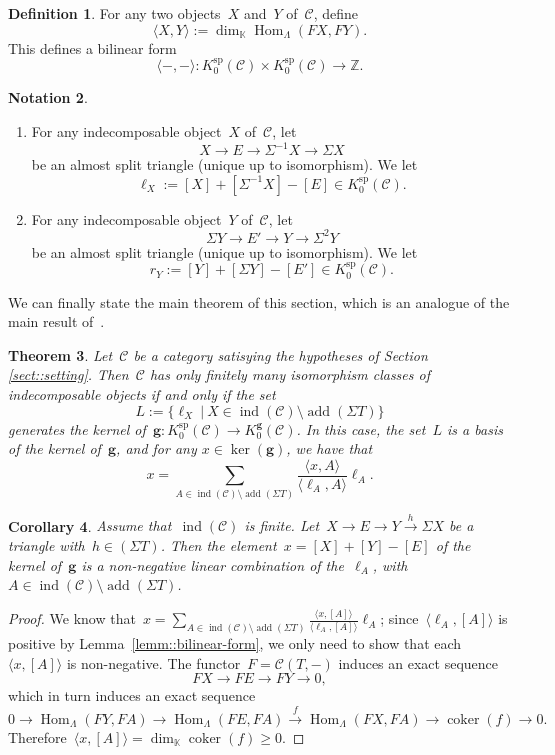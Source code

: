 \documentclass{amsart}
\newtheorem{theorem}{Theorem}[section]
\newtheorem{corollary}[theorem]{Corollary}
\theoremstyle{definition}
\newtheorem{definition}[theorem]{Definition}
\newtheorem{notation}[theorem]{Notation}
\newcommand{\Z}{\mathbb{Z}} %
\renewcommand{\b}[1]{{\boldsymbol{#1}}} %
\newcommand{\field}{\mathbb{K}}
\newcommand{\cat}{\mathcal{C}}
\newcommand{\Hom}[1]{\operatorname{Hom}_{#1}}
\newcommand{\susp}{\Sigma}
\newcommand{\add}{\operatorname{add}}
\newcommand{\spl}{\operatorname{sp}}
\newcommand{\Ksp}{K_0^{\spl}}
\newcommand{\Kg}{K_0^{\b{g}}}
\newcommand{\ind}{\operatorname{ind}}
\newcommand{\coker}{\operatorname{coker}}
\begin{document}
\begin{definition}\label{defi::bilinear form}
 For any two objects~$X$ and~$Y$ of~$\cat$, define
 \[
  \langle X, Y \rangle := \dim_{\field} \Hom{\Lambda}(FX,FY).
 \]
 This defines a bilinear form
 \[
  \langle -,-\rangle : \Ksp(\cat) \times \Ksp(\cat) \xrightarrow{} \Z.
 \]
\end{definition}

\begin{notation}\label{notation::ell_X}
\begin{enumerate}
 \item For any indecomposable object~$X$ of~$\cat$, let
 \[
  X \to E \to \susp^{-1} X \to \susp X
 \]
 be an almost split triangle (unique up to isomorphism).  We let
 \[
  \ell_X := [X] + [\susp^{-1} X]  - [E] \in \Ksp(\cat).
 \]
 
 \item For any indecomposable object~$Y$ of~$\cat$, let
 \[
  \susp Y \to E' \to  Y \to \susp^2 Y
 \]
 be an almost split triangle (unique up to isomorphism).  We let
 \[
  r_Y := [Y] + [\susp Y]  - [E'] \in \Ksp(\cat).
 \]
\end{enumerate}
\end{notation}


We can finally state the main theorem of this section, which is an analogue of the main result of~\cite{Auslander1984}.

\begin{theorem}\label{theo::relations-g-vecteurs}
 Let~$\cat$ be a category satisying the hypotheses of Section \ref{sect::setting}.  Then~$\cat$ has only finitely many isomorphism classes of indecomposable objects if and only if the set~\[L:=\big\{\ell_X \ | \ X\in \ind(\cat)\setminus \add(\susp T) \big\}\] generates the kernel of~$\b g:\Ksp(\cat) \to \Kg(\cat)$. 
 In this case, the set~$L$ is a basis of the kernel of~$\b g$, and for any $x\in \ker(\b g)$, we have that
 \[
  x= \sum_{A\in \ind(\cat) \setminus \add(\susp T)} \frac{\langle x, A \rangle}{\langle \ell_A, A \rangle} \ell_A.
 \]
\end{theorem}

\begin{corollary}
 Assume that~$\ind(\cat)$ is finite.  Let~$X\xrightarrow{} E \xrightarrow{} Y \xrightarrow{h} \susp X$ be a triangle with~$h\in (\susp T)$.  Then the element~$x=[X]+[Y]-[E]$ of the kernel of~$\b g$ is a non-negative linear combination of the~$\ell_A$, with~$A\in \ind(\cat)\setminus \add(\susp T)$.
\end{corollary}
\begin{proof}
 We know that~$x=\sum_{A\in \ind(\cat)\setminus \add(\susp T)} \frac{\langle x, [A] \rangle}{\langle \ell_A, [A] \rangle} \ell_A$; since~$\langle \ell_A, [A] \rangle$ is positive by Lemma~\ref{lemm::bilinear-form}, we only need to show that each~$\langle x, [A] \rangle$ is non-negative. 
 The functor~$F=\cat(T,-)$ induces an exact sequence
 \[
  FX \to FE \to FY \to 0,
 \]
 which in turn induces an exact sequence
 \[
  0\to \Hom{\Lambda}(FY, FA) \to \Hom{\Lambda}(FE, FA) \xrightarrow{f} \Hom{\Lambda}(FX, FA) \to \coker(f) \to 0.
 \]
 Therefore~$\langle x, [A] \rangle = \dim_{\field} \coker(f) \geq 0$.
\end{proof}
\end{document}
